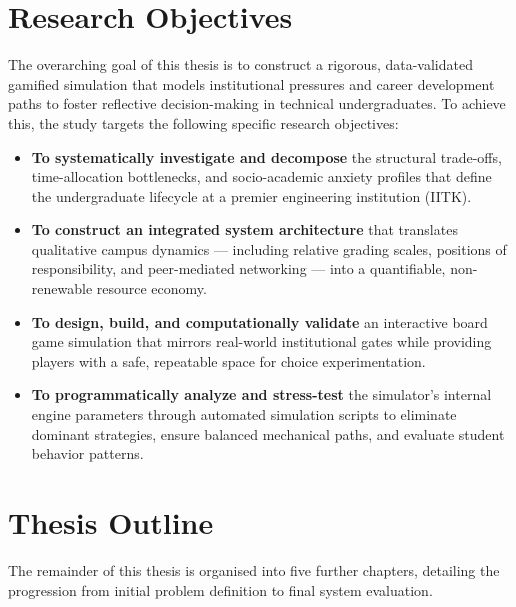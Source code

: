 \section{Research Objectives}
\label{sec:objectives}

The overarching goal of this thesis is to construct a rigorous, data-validated gamified simulation that models institutional pressures and career development paths to foster reflective decision-making in technical undergraduates. To achieve this, the study targets the following specific research objectives:

\begin{itemize}
  \setlength\itemsep{0.4em}
  \item \textbf{To systematically investigate and decompose} the structural trade-offs, time-allocation bottlenecks, and socio-academic anxiety profiles that define the undergraduate lifecycle at a premier engineering institution (IITK).

  \item \textbf{To construct an integrated system architecture} that translates qualitative campus dynamics --- including relative grading scales, positions of responsibility, and peer-mediated networking --- into a quantifiable, non-renewable resource economy.

  \item \textbf{To design, build, and computationally validate} an interactive board game simulation that mirrors real-world institutional gates while providing players with a safe, repeatable space for choice experimentation.

  \item \textbf{To programmatically analyze and stress-test} the simulator's internal engine parameters through automated simulation scripts to eliminate dominant strategies, ensure balanced mechanical paths, and evaluate student behavior patterns.
\end{itemize}

\section{Thesis Outline}
\label{sec:outline}

The remainder of this thesis is organised into five further chapters, detailing the progression from initial problem definition to final system evaluation.

